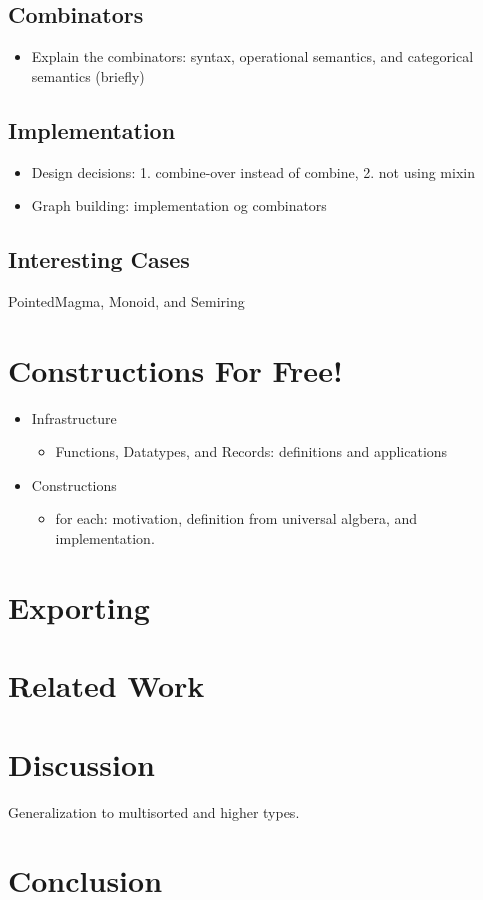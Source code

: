 \documentclass[]{article}
\begin{document}
\subsection{Combinators}
    \begin{itemize}
        \item Explain the combinators: syntax, operational semantics, and categorical semantics (briefly)
    \end{itemize}
\subsection{Implementation}
    \begin{itemize}
        \item Design decisions: 1. combine-over instead of combine, 2. not using mixin 
        \item Graph building: implementation og combinators 
    \end{itemize}
\subsection{Interesting Cases}
PointedMagma, Monoid, and Semiring 

\section{Constructions For Free!}    
\begin{itemize}
    \item Infrastructure
    \begin{itemize}
        \item Functions, Datatypes, and Records: definitions and applications 
    \end{itemize}
    \item Constructions 
    \begin{itemize}
        \item for each: motivation, definition from universal algbera, and implementation. 
    \end{itemize}
\end{itemize}

\section{Exporting}

\section{Related Work}

\section{Discussion}
Generalization to multisorted and higher types. 

\section{Conclusion}

    
\end{document}
